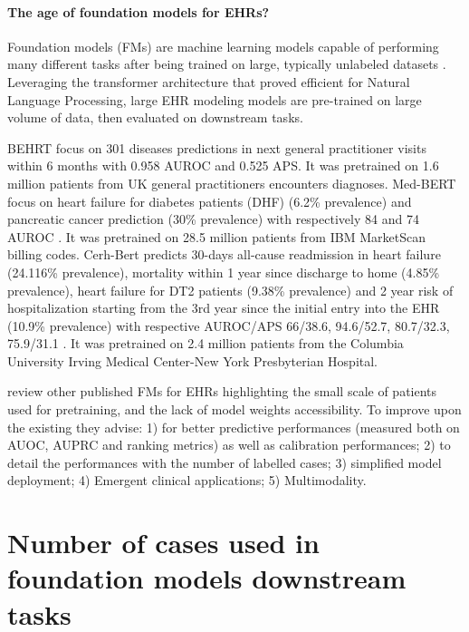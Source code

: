 \documentclass[french,12pt,twoside,a4paper]{book}
\begin{document}
\begin{appendices}
  \paragraph{The age of foundation models for EHRs?}

  Foundation models (FMs) are machine learning models capable of performing many
  different tasks after being trained on large, typically unlabeled datasets
  \citep{wornow2023shaky}. Leveraging the transformer architecture \cite{vaswani2017attention} that proved
  efficient for Natural Language Processing, large EHR modeling models are
  pre-trained on large volume of data, then evaluated on downstream tasks.%

  \textcolor{M}{BEHRT} focus on \textcolor{O}{301 diseases predictions in next general
    practitioner visits within 6 months} with \textcolor{S}{0.958 AUROC and 0.525
    APS}. It was pretrained on 1.6 million patients from UK general practitioners
  encounters diagnoses. %
  \textcolor{M}{Med-BERT} focus on \textcolor{O}{heart failure for diabetes patients
    (DHF) (6.2\% prevalence) and pancreatic cancer prediction (30\% prevalence)}
  with respectively \textcolor{S}{84 and 74 AUROC } \citep{rasmy2021med}. It was
  pretrained on 28.5 million patients from IBM MarketScan billing codes. %
  \textcolor{M}{Cerh-Bert} predicts \textcolor{O}{30-days all-cause readmission in
    heart failure (24.116\% prevalence), mortality within 1 year since discharge
    to home (4.85\% prevalence), heart failure for DT2 patients (9.38\%
    prevalence) and 2 year risk of hospitalization starting from the 3rd year
    since the initial entry into the EHR (10.9\% prevalence)} with respective
  AUROC/APS \textcolor{S}{66/38.6, 94.6/52.7, 80.7/32.3, 75.9/31.1}
  \citep{pang2021cehr}. It was pretrained on 2.4 million patients from the
  Columbia University Irving Medical Center-New York Presbyterian Hospital.%

  \cite{wornow2023shaky} review other published FMs for EHRs highlighting the
  small scale of patients used for pretraining, and the lack of model weights
  accessibility. To improve upon the existing they advise: 1) for better
  predictive performances (measured both on AUOC, AUPRC and ranking metrics) as
  well as calibration performances; 2) to detail the performances with the number
  of labelled cases; 3) simplified model deployment; 4) Emergent clinical
  applications; 5) Multimodality.

  \section{Number of cases used in foundation models downstream tasks}%
  \label{apd:foundation_model_nb_cases}


\end{appendices}
\end{document}
